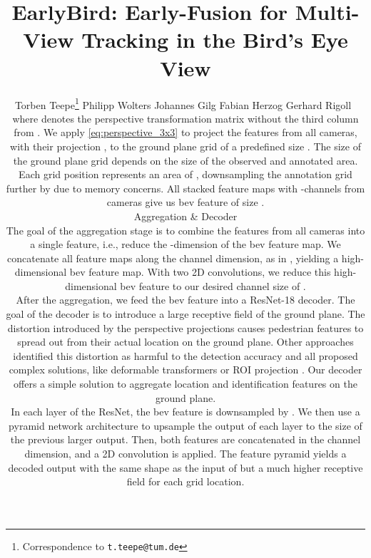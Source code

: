 \documentclass[10pt,twocolumn,letterpaper]{article}
\begin{document}
\title{EarlyBird: Early-Fusion for Multi-View Tracking in the Bird’s Eye View}


\author{
Torben Teepe\thanks{Correspondence to \texttt{t.teepe@tum.de}} \qquad Philipp Wolters \qquad Johannes Gilg \qquad Fabian Herzog \qquad Gerhard Rigoll\
\label{eq:perspective_4x3}
\resizebox{0.9\linewidth}{!}{
}
\label{eq:perspective_3x3}
\resizebox{0.78\linewidth}{!}{}
where  denotes the  perspective transformation matrix without the third column from . We apply \cref{eq:perspective_3x3} to project the features from all  cameras, with their projection , to the ground plane grid of a predefined size . The size of the ground plane grid depends on the size of the observed and annotated area. Each grid position represents an area of , downsampling the annotation grid further by  due to memory concerns. All stacked feature maps with -channels from  cameras give us \gls{bev} feature of size . 

\subsection{Aggregation \& Decoder}
The goal of the aggregation stage is to combine the features from all  cameras into a single feature, i.e., reduce the -dimension of the \gls{bev} feature map. We concatenate all feature maps along the channel dimension, as in , yielding a high-
dimensional \gls{bev} feature map. With two 2D convolutions, we reduce this high-dimensional \gls{bev} feature to our desired channel size of .

After the aggregation, we feed the \gls{bev} feature into a ResNet-18 decoder. The goal of the decoder is to introduce a large receptive field of the ground plane. The distortion introduced by the perspective projections causes pedestrian features to spread out from their actual location on the ground plane. Other approaches \cite{hou2021multiview, song2021stacked, qiu20223d, lee2023multi} identified this distortion as harmful to the detection accuracy and all proposed complex solutions, like deformable transformers \cite{hou2021multiview} or ROI projection \cite{lee2023multi}. Our decoder offers a simple solution to aggregate location and identification features on the ground plane.

In each layer of the ResNet, the \gls{bev} feature is downsampled by . We then use a pyramid network architecture to upsample the output of each layer to the size of the previous larger output. Then, both features are concatenated in the channel dimension, and a 2D convolution is applied. The feature pyramid yields a decoded output with the same shape as the input of  but a much higher receptive field for each grid location. 

}
\end{document}
